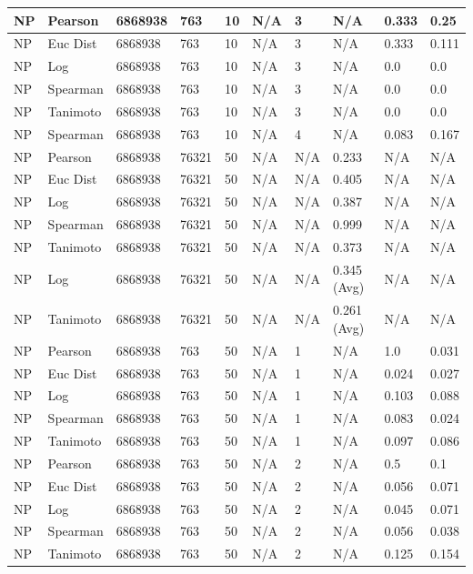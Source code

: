 \documentclass{article}
\begin{document}
\begin{longtable}{ |p{1.7cm}|p{1.9cm}|p{1.5cm}|p{1.5cm}|p{0.75cm}|p{0.75cm}|p{0.75cm}|p{0.75cm}|p{1.5cm}|p{1.5cm}|}
    NP & Pearson & 6868938 & 763 & 10&  N/A & 3 & N/A & 0.333 & 0.25  \\ \hline
    NP & Euc Dist & 6868938 & 763 & 10 & N/A & 3  & N/A &0.333 & 0.111   \\ \hline
    NP & Log & 6868938 & 763 & 10 &  N/A & 3  & N/A & 0.0 & 0.0  \\ \hline
    NP & Spearman & 6868938 & 763 & 10 & N/A & 3  & N/A &0.0 & 0.0 \\ \hline
    NP & Tanimoto & 6868938 & 763 & 10 & N/A & 3 & N/A & 0.0 & 0.0 \\ \hline
    NP & Spearman & 6868938 & 763 & 10 & N/A &  4 & N/A & 0.083 & 0.167 \\ \hline
    
    NP & Pearson & 6868938 & 76321 & 50 &  N/A & N/A & 0.233 & N/A & N/A  \\ \hline
    NP & Euc Dist & 6868938 & 76321 & 50 & N/A & N/A & 0.405 & N/A & N/A   \\ \hline
    NP & Log & 6868938 & 76321 & 50 &  N/A & N/A & 0.387 & N/A & N/A  \\ \hline
    NP & Spearman & 6868938 & 76321 & 50 & N/A & N/A & 0.999 & N/A & N/A \\ \hline
    NP & Tanimoto & 6868938 & 76321 & 50 & N/A & N/A & 0.373 & N/A & N/A \\ \hline
    NP & Log & 6868938 & 76321 & 50 & N/A & N/A & 0.345 (Avg) & N/A & N/A \\ \hline
    NP & Tanimoto & 6868938 & 76321 & 50 & N/A & N/A & 0.261 (Avg) & N/A & N/A \\ \hline
    
    NP & Pearson & 6868938 & 763 & 50 &  N/A & 1 & N/A & 1.0 & 0.031  \\ \hline
    NP & Euc Dist & 6868938 & 763 & 50 & N/A & 1 & N/A &0.024 & 0.027   \\ \hline
    NP & Log & 6868938 & 763 & 50 &  N/A & 1 & N/A & 0.103 & 0.088  \\ \hline
    NP & Spearman & 6868938 & 763 & 50 & N/A & 1 & N/A &0.083 & 0.024 \\ \hline
    NP & Tanimoto & 6868938 & 763 & 50 & N/A & 1 & N/A & 0.097 & 0.086 \\ \hline
    
    NP & Pearson & 6868938 & 763 & 50 &  N/A & 2 & N/A & 0.5 & 0.1  \\ \hline
    NP & Euc Dist & 6868938 & 763 & 50 & N/A &  2 & N/A &0.056 & 0.071   \\ \hline
    NP & Log & 6868938 & 763 & 50 &  N/A &  2 & N/A & 0.045 & 0.071 \\ \hline
    NP & Spearman & 6868938 & 763 & 50 & N/A &  2 & N/A & 0.056 & 0.038 \\ \hline
    NP & Tanimoto & 6868938 & 763 & 50 & N/A &  2 & N/A & 0.125 & 0.154 \\ \hline
    

\end{longtable}
\end{document}
